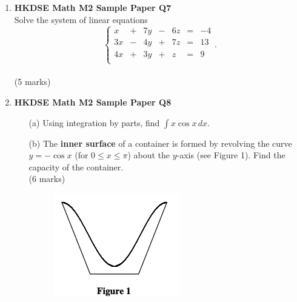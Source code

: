 \documentclass{report}
\begin{document}
\begin{enumerate}
	\item \textbf{HKDSE Math M2 Sample Paper Q7}\\
	Solve the system of linear equations
	$$\left\{\begin{matrix}
		x & + & 7y & - & 6z & = & -4\\
		3x & - & 4y & + & 7z & = & 13\\
		4x & + & 3y & + & z & = & 9\\
	\end{matrix}\right..$$ \\(5 marks)

	\newpage

	\item \textbf{HKDSE Math M2 Sample Paper Q8}
	\begin{enumerate}
		\item [(a)]Using integration by parts, find $\displaystyle\int x\cos{x}\,dx$. 
		\item [(b)]The \textbf{inner surface} of a container is formed by revolving the curve $y = -\cos{x}$ (for $0 \leq x \leq \pi$) about the $y$-axis (see Figure 1). Find the capacity of the container. \\(6 marks)
		\begin{figure}[H]
			\centering
			\includegraphics[width = .3\linewidth]{SPFigure1}
		\end{figure}
	\end{enumerate}


\end{enumerate}
\end{document}
